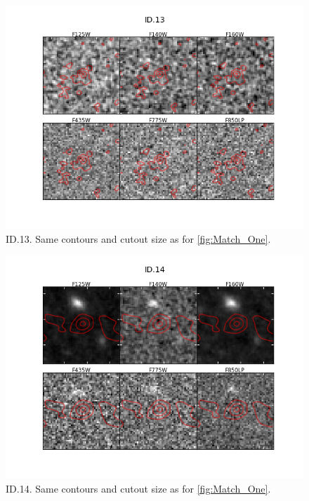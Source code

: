 \begin{figure}[tbp]
\centering \includegraphics[width=160mm]{Matched/ASPECS_Cutout_12.png}
\caption{ID.13. Same contours and cutout size as for \ref{fig:Match_One}.}
\label{fig:Match_Three}
\end{figure}

\begin{figure}[tbp]
\centering \includegraphics[width=160mm]{Matched/ASPECS_Cutout_13.png}
\caption{ID.14. Same contours and cutout size as for \ref{fig:Match_One}.}
\label{fig:Match_Three}
\end{figure}


